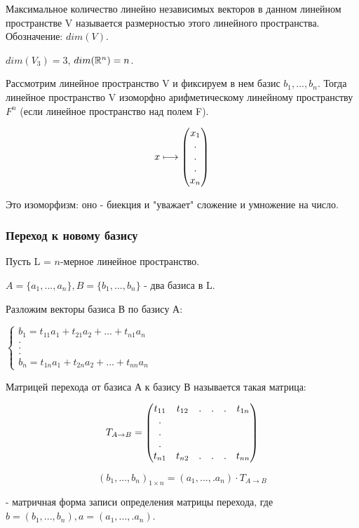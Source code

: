 \documentclass[../main.tex]{subfiles}
\begin{document}
\void{} Максимальное количество линейно независимых векторов в данном линейном
пространстве V называется размерностью этого линейного пространства. Обозначение: $dim(V)$.

\void{} $dim(V_3) = 3$, $dim(\mathbb{R}^n) = n$.

\void{} Рассмотрим линейное пространство V и фиксируем в нем базис $b_1,...,b_n$.
Тогда линейное пространство V изоморфно арифметическому линейному пространству $F^n$
(если линейное пространство над полем F).

$$x \longmapsto \begin{pmatrix} x_1\\.\\.\\.\\x_n\end{pmatrix}$$

Это изоморфизм: оно - биекция и "уважает" сложение и умножение на число.

\subsubsection{Переход к новому базису}

Пусть L = $n$-мерное линейное пространство.

$A = \{a_1,...,a_n\}, B = \{b_1,...,b_n\}$ - два базиса в L.

Разложим векторы базиса В по базису А:

$\left\{ 
    \begin{matrix}
        b_1 = t_{11}a_1 + t_{21}a_2 + ... + t_{n1}a_n\\
        .\\
        .\\
        .\\
        b_n = t_{1n}a_1 + t_{2n}a_2 + ... + t_{nn}a_n
    \end{matrix}
\right.$

\void{} Матрицей перехода от базиса А к базису В называется такая матрица:

$$ T_{A\rightarrow B} = \begin{pmatrix} t_{11} & t_{12} & . & . & . & t_{1n}\\.\\.\\.\\t_{n1} & t_{n2} & . & . & . & t_{nn}\end{pmatrix}$$

$$(b_1,...,b_n)_{1\times n} = (a_1,...,.a_n)\cdot T_{A\rightarrow B}$$


- матричная форма записи определения матрицы перехода, где 
$b = (b_1,...,b_n), a = (a_1,...,.a_n)$.
\end{document}

